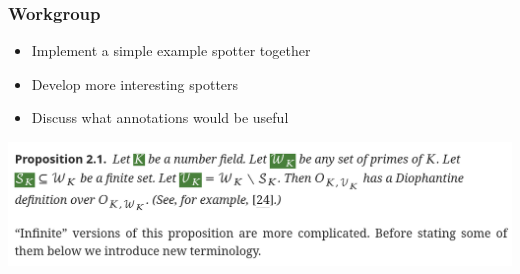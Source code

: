 \documentclass[aspectratio=169]{beamer}
\begin{document}


\begin{frame}
    \frametitle{Workgroup}

    \begin{itemize}
        \item Implement a simple example spotter together
        \item Develop more interesting spotters
        \item Discuss what annotations would be useful
    \end{itemize}
    \vspace{1em}

    \centering
    \includegraphics[scale=0.5]{annotize-decls.png}\par
\end{frame}
\end{document}
